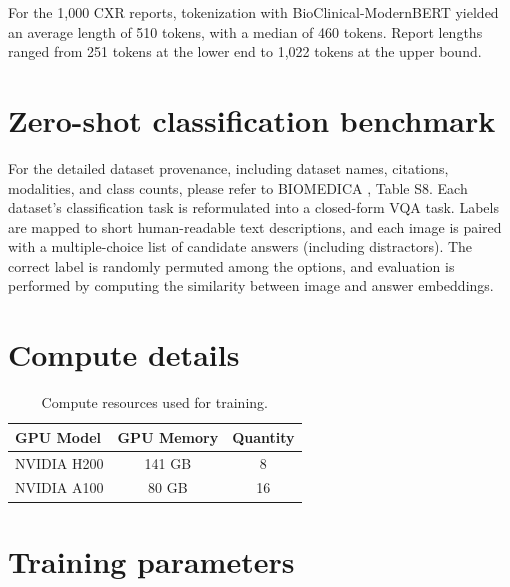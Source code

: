 For the 1,000 CXR reports, tokenization with BioClinical-ModernBERT yielded an average length of 510 tokens, with a median of 460 tokens. Report lengths ranged from 251 tokens at the lower end to 1,022 tokens at the upper bound.





\section{Zero-shot classification benchmark}\label{apd:zeroshot}
For the detailed dataset provenance, including dataset names, citations, modalities, and class counts, please refer to BIOMEDICA \cite{biomedica}, Table S8. Each dataset’s classification task is reformulated into a closed-form VQA task. Labels are mapped to short human-readable text descriptions, and each image is paired with a multiple-choice list of candidate answers (including distractors). The correct label is randomly permuted among the options, and evaluation is performed by computing the similarity between image and answer embeddings.


\section{Compute details}\label{apd:compute}

\begin{table}[h]
\centering
\begin{tabular}{l c c}
\toprule
\rowcolor{gray!10} \textbf{GPU Model} & \textbf{GPU Memory} & \textbf{Quantity} \\
\midrule
NVIDIA H200 & 141 GB & 8 \\
NVIDIA A100 & 80 GB & 16 \\
\bottomrule
\end{tabular}
\caption{Compute resources used for training.}
\end{table}



\section{Training parameters}\label{apd:param}

